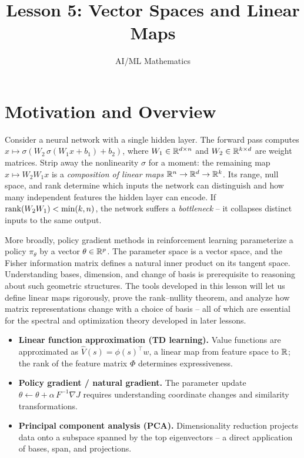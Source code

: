 \documentclass[11pt,a4paper]{article}
\title{Lesson 5: Vector Spaces and Linear Maps}
\author{AI/ML Mathematics}
\date{}
\begin{document}
\maketitle
\tableofcontents
\newpage

\section{Motivation and Overview}
\label{sec:motivation}

Consider a neural network with a single hidden layer.  The forward pass computes
$x \mapsto \sigma(W_2 \,\sigma(W_1 x + b_1) + b_2)$, where $W_1 \in \mathbb{R}^{d \times n}$
and $W_2 \in \mathbb{R}^{k \times d}$ are weight matrices.  Strip away the nonlinearity
$\sigma$ for a moment: the remaining map $x \mapsto W_2 W_1 x$ is a \emph{composition
of linear maps} $\mathbb{R}^n \to \mathbb{R}^d \to \mathbb{R}^k$.  Its range, null space, and rank determine
which inputs the network can distinguish and how many independent features the hidden
layer can encode.  If $\operatorname{rank}(W_2 W_1) < \min(k, n)$, the network suffers a
\emph{bottleneck} -- it collapses distinct inputs to the same output.

More broadly, policy gradient methods in reinforcement learning parameterize a policy
$\pi_\theta$ by a vector $\theta \in \mathbb{R}^p$.  The parameter space is a vector space, and
the Fisher information matrix defines a natural inner product on its tangent space.
Understanding bases, dimension, and change of basis is prerequisite to reasoning about
such geometric structures.  The tools developed in this lesson will let us define linear
maps rigorously, prove the rank--nullity theorem, and analyze how matrix representations
change with a choice of basis -- all of which are essential for the spectral and
optimization theory developed in later lessons.

\begin{rlconnection}[title={Where Vector Spaces and Linear Maps Appear in RL/ML}]
\begin{itemize}[nosep]
  \item \textbf{Linear function approximation (TD learning).}
        Value functions are approximated as $\hat{V}(s) = \phi(s)^\top w$, a linear
        map from feature space to $\mathbb{R}$; the rank of the feature matrix $\Phi$
        determines expressiveness.
  \item \textbf{Policy gradient / natural gradient.}
        The parameter update $\theta \leftarrow \theta + \alpha \, F^{-1} \nabla J$
        requires understanding coordinate changes and similarity transformations.
  \item \textbf{Principal component analysis (PCA).}
        Dimensionality reduction projects data onto a subspace spanned by the top
        eigenvectors -- a direct application of bases, span, and projections.
\end{itemize}
\end{rlconnection}
\end{document}
